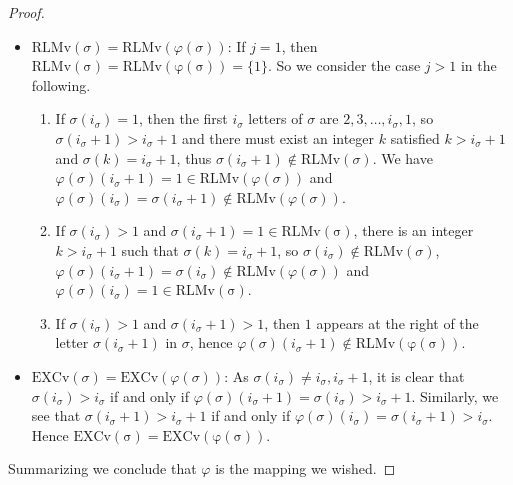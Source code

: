\documentclass[12pt,reqno]{amsart}
\numberwithin{equation}{section}
\newcounter{num}
\begin{document}
\begin{proof}
\begin{itemize}
\item $\mathrm{RLMv}(\sigma)=\mathrm{RLMv}(\varphi(\sigma))$:
If $j=1$, then  $\mathrm{RLMv(\sigma)}=\mathrm{RLMv(\varphi(\sigma))}=\{1\}$. So we consider the case $j>1$ in the following.
\begin{enumerate}
\item If $\sigma(i_\sigma)=1$, then the first $i_\sigma$ letters of $\sigma$ are $2, 3, \ldots, i_\sigma, 1$, so 
$\sigma(i_\sigma+1)>i_\sigma+1$ and there must exist an integer $k$ satisfied $k>i_\sigma+1$ and $\sigma(k)=i_\sigma+1$, thus  $\sigma(i_\sigma+1)\notin\mathrm{RLMv}(\sigma)$.
We have $\varphi(\sigma)(i_\sigma+1)=1\in\mathrm{RLMv}(\varphi(\sigma))$ and $\varphi(\sigma)(i_\sigma)=\sigma(i_\sigma+1)\notin\mathrm{RLMv}(\varphi(\sigma))$.
\item If $\sigma(i_\sigma)>1$ and  $\sigma(i_\sigma+1)=1\in\mathrm{RLMv(\sigma)}$,
there is  an integer  
$k>i_\sigma+1$ such that  $\sigma(k)=i_\sigma+1$, so  $\sigma(i_\sigma)\notin \mathrm{RLMv}(\sigma)$,
$\varphi(\sigma)(i_\sigma+1)=\sigma(i_\sigma)\notin\mathrm{RLMv}(\varphi(\sigma))$ and  $\varphi(\sigma)(i_\sigma)=1\in\mathrm{RLMv(\sigma)}$.
\item
If $\sigma(i_\sigma)>1$ and $\sigma(i_\sigma+1)>1$, then 
$1$ appears at the right of the letter  $\sigma(i_\sigma+1)$ 
in $\sigma$, hence  $\varphi(\sigma)(i_\sigma+1)\notin\mathrm{RLMv(\varphi(\sigma))}$.
\end{enumerate}

\item  $\mathrm{EXCv}(\sigma)=\mathrm{EXCv}(\varphi(\sigma))$:
As $\sigma(i_\sigma)\neq i_\sigma, i_\sigma+1$, it is clear that $\sigma(i_\sigma)>i_\sigma$ if and only if 
$\varphi(\sigma)(i_\sigma+1)=\sigma(i_\sigma)>i_\sigma+1$.
Similarly, we see that $\sigma(i_\sigma+1)>
i_\sigma+1$ if and only if 
$\varphi(\sigma)(i_\sigma)=\sigma(i_\sigma+1)>i_\sigma$. Hence
$\mathrm{EXCv(\sigma)}=\mathrm{EXCv(\varphi(\sigma))}$.
\end{itemize}
Summarizing we conclude that  $\varphi$ 
is the mapping we wished.
\end{proof}
\end{document}
